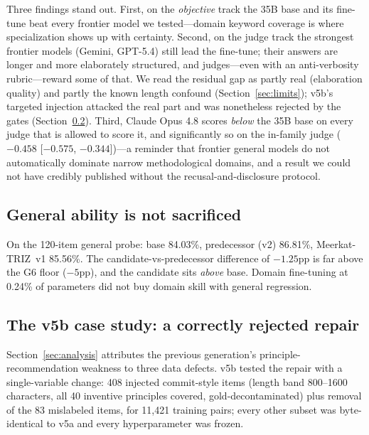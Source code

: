 \documentclass[11pt]{article}
\newcommand{\model}{Meerkat-TRIZ}
\begin{document}
Three findings stand out. First, on the \emph{objective} track the 35B
base and its fine-tune beat every frontier model we tested---domain
keyword coverage is where specialization shows up with certainty.
Second, on the judge track the strongest frontier models (Gemini,
GPT-5.4) still lead the fine-tune; their answers are longer and more
elaborately structured, and judges---even with an anti-verbosity
rubric---reward some of that. We read the residual gap as partly real
(elaboration quality) and partly the known length confound
(Section~\ref{sec:limits}); v5b's targeted injection attacked the real
part and was nonetheless rejected by the gates
(Section~\ref{sec:v5b}). Third, Claude Opus 4.8 scores \emph{below} the 35B base
on every judge that is allowed to score it, and significantly so on the
in-family judge ($-0.458$ [$-0.575$, $-0.344$])---a reminder that
frontier general models do not automatically dominate narrow
methodological domains, and a result we could not have credibly
published without the recusal-and-disclosure protocol.

\subsection{General ability is not sacrificed}
On the 120-item general probe: base 84.03\%, predecessor (v2) 86.81\%,
\model~v1 85.56\%. The candidate-vs-predecessor difference of $-1.25$pp
is far above the G6 floor ($-5$pp), and the candidate sits
\emph{above} base. Domain fine-tuning at 0.24\% of parameters did not
buy domain skill with general regression.

\subsection{The v5b case study: a correctly rejected repair}
\label{sec:v5b}
Section~\ref{sec:analysis} attributes the previous generation's
principle-recommendation weakness to three data defects. v5b tested the
repair with a single-variable change: 408 injected commit-style items
(length band 800--1600 characters, all 40 inventive principles covered,
gold-decontaminated) plus removal of the 83 mislabeled items, for
11{,}421 training pairs; every other subset was byte-identical to v5a
and every hyperparameter was frozen.
\end{document}
